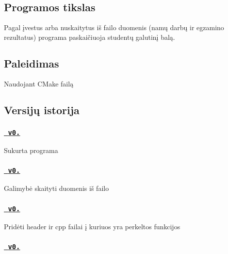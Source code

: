 \subsection*{Programos tikslas}

Pagal įvestus arba nuskaitytus iš failo duomenis (namų darbų ir egzamino rezultatus) programa paskaičiuoja studentų galutinį balą.

\subsection*{Paleidimas}

Naudojant C\+Make failą

\subsection*{Versijų istorija}

\subsubsection*{\href{https://github.com/karas245/2-uzd/releases/tag/v0.1}{\texttt{ v0.}}}


\begin{DoxyItemize}
\item Sukurta programa \subsubsection*{\href{https://github.com/karas245/2-uzd/releases/tag/v0.2}{\texttt{ v0.}}}
\end{DoxyItemize}


\begin{DoxyItemize}
\item Galimybė skaityti duomenis iš failo \subsubsection*{\href{https://github.com/karas245/2-uzd/releases/tag/v0.3}{\texttt{ v0.}}}
\end{DoxyItemize}


\begin{DoxyItemize}
\item Pridėti header ir cpp failai į kuriuos yra perkeltos funkcijos \subsubsection*{\href{https://github.com/karas245/2-uzd/releases/tag/v0.4}{\texttt{ v0.}}}
\end{DoxyItemize}


